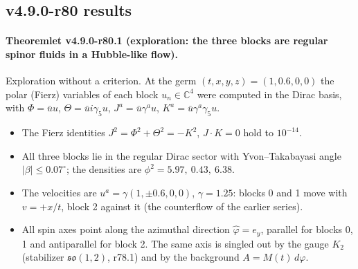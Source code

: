 \subsection*{v4.9.0-r80 results}
\label{subsec:v490-r80-results}

\paragraph{Theoremlet v4.9.0-r80.1 (exploration: the three blocks are regular spinor fluids in a Hubble-like flow).}
Exploration without a criterion.  At the germ \((t,x,y,z)=(1,0.6,0,0)\) the polar (Fierz) variables of each block
\(u_n\in\mathbb C^4\) were computed in the Dirac basis, with \(\Phi=\bar u u\), \(\Theta=\bar u i\gamma_5u\),
\(J^a=\bar u\gamma^a u\), \(K^a=\bar u\gamma^a\gamma_5u\).
\begin{itemize}[leftmargin=2em]
\item The Fierz identities \(J^2=\Phi^2+\Theta^2=-K^2\), \(J\cdot K=0\) hold to \(10^{-14}\).
\item All three blocks lie in the regular Dirac sector with Yvon--Takabayasi angle \(|\beta|\le0.07^\circ\); the densities
are \(\phi^2=5.97,\ 0.43,\ 6.38\).
\item The velocities are \(u^a=\gamma(1,\pm0.6,0,0)\), \(\gamma=1.25\): blocks 0 and 1 move with \(v=+x/t\), block 2 against
it (the counterflow of the earlier series).
\item All spin axes point along the azimuthal direction \(\hat\varphi=e_y\), parallel for blocks 0, 1 and antiparallel for
block 2.  The same axis is singled out by the gauge \(K_2\) (stabilizer \(\mathfrak{so}(1,2)\), r78.1) and by the background
\(A=M(t)\,d\varphi\).
\end{itemize}

